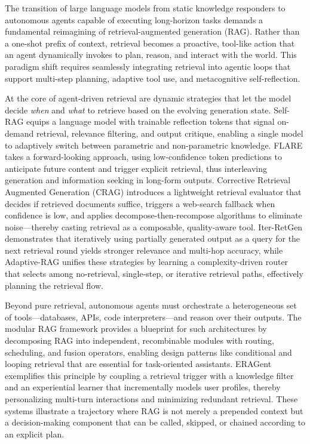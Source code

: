 \documentclass[11pt,a4paper]{article}
\begin{document}
The transition of large language models from static knowledge responders to autonomous agents capable of executing long-horizon tasks demands a fundamental reimagining of retrieval-augmented generation (RAG). Rather than a one-shot prefix of context, retrieval becomes a proactive, tool-like action that an agent dynamically invokes to plan, reason, and interact with the world. This paradigm shift requires seamlessly integrating retrieval into agentic loops that support multi-step planning, adaptive tool use, and metacognitive self-reflection.

At the core of agent-driven retrieval are dynamic strategies that let the model decide \emph{when} and \emph{what} to retrieve based on the evolving generation state. Self-RAG \cite{arxiv:2310.11511v1} equips a language model with trainable reflection tokens that signal on-demand retrieval, relevance filtering, and output critique, enabling a single model to adaptively switch between parametric and non-parametric knowledge. FLARE \cite{arxiv:2305.06983v2} takes a forward-looking approach, using low-confidence token predictions to anticipate future content and trigger explicit retrieval, thus interleaving generation and information seeking in long-form outputs. Corrective Retrieval Augmented Generation (CRAG) \cite{arxiv:2401.15884v2} introduces a lightweight retrieval evaluator that decides if retrieved documents suffice, triggers a web-search fallback when confidence is low, and applies decompose-then-recompose algorithms to eliminate noise---thereby casting retrieval as a composable, quality-aware tool. Iter-RetGen \cite{arxiv:2305.15294v2} demonstrates that iteratively using partially generated output as a query for the next retrieval round yields stronger relevance and multi-hop accuracy, while Adaptive-RAG \cite{arxiv:2403.14403v2} unifies these strategies by learning a complexity-driven router that selects among no-retrieval, single-step, or iterative retrieval paths, effectively planning the retrieval flow.

Beyond pure retrieval, autonomous agents must orchestrate a heterogeneous set of tools---databases, APIs, code interpreters---and reason over their outputs. The modular RAG framework \cite{arxiv:2407.21059v1} provides a blueprint for such architectures by decomposing RAG into independent, recombinable modules with routing, scheduling, and fusion operators, enabling design patterns like conditional and looping retrieval that are essential for task-oriented assistants. ERAGent \cite{arxiv:2405.06683v1} exemplifies this principle by coupling a retrieval trigger with a knowledge filter and an experiential learner that incrementally models user profiles, thereby personalizing multi-turn interactions and minimizing redundant retrieval. These systems illustrate a trajectory where RAG is not merely a prepended context but a decision-making component that can be called, skipped, or chained according to an explicit plan.
\end{document}
